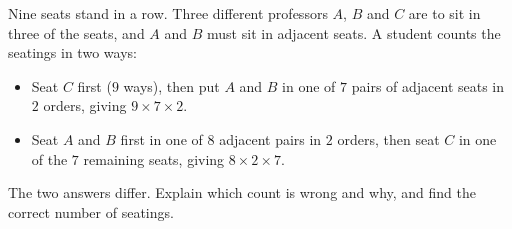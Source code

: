 Nine seats stand in a row. Three different professors \(A\), \(B\) and \(C\) are to sit in three of the seats, and \(A\) and \(B\) must sit in adjacent seats. A student counts the seatings in two ways:
\begin{itemize}
\item Seat \(C\) first (\(9\) ways), then put \(A\) and \(B\) in one of \(7\) pairs of adjacent seats in \(2\) orders, giving \(9\times 7\times 2\).
\item Seat \(A\) and \(B\) first in one of \(8\) adjacent pairs in \(2\) orders, then seat \(C\) in one of the \(7\) remaining seats, giving \(8\times 2\times 7\).
\end{itemize}
The two answers differ. Explain which count is wrong and why, and find the correct number of seatings.
